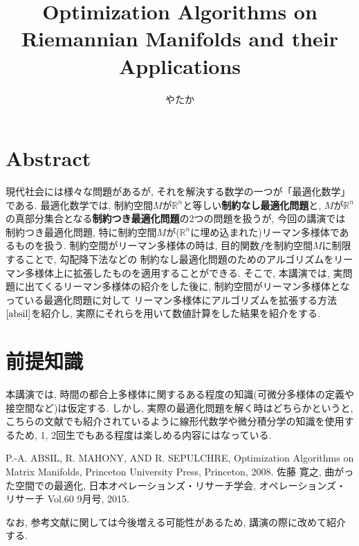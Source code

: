 \documentclass[11pt, a4paper, dvipdfmx]{jsarticle}
\title{Optimization Algorithms on Riemannian Manifolds and their Applications}
\author{やたか}
\date{}
\theoremstyle{definition}
\newcommand{\R}{\mathbb{R}}
\begin{document}
    
    \maketitle
    \section*{Abstract}
    現代社会には様々な問題があるが, それを解決する数学の一つが「最適化数学」である. 
    最適化数学では, 制約空間$M$が$\R^n$と等しい\textbf{制約なし最適化問題}と,
    $M$が$\R^n$の真部分集合となる\textbf{制約つき最適化問題}の2つの問題を扱うが, 今回の講演では
    制約つき最適化問題, 特に制約空間$M$が($\R^n$に埋め込まれた)リーマン多様体であるものを扱う.
    制約空間がリーマン多様体の時は, 目的関数$f$を制約空間$M$に制限することで, 勾配降下法などの
    制約なし最適化問題のためのアルゴリズムをリーマン多様体上に拡張したものを適用することができる. そこで, 本講演では,  
    実問題に出てくるリーマン多様体の紹介をした後に, 制約空間がリーマン多様体となっている最適化問題に対して
    リーマン多様体にアルゴリズムを拡張する方法$\cite{absil}$を紹介し, 実際にそれらを用いて数値計算をした結果を紹介をする. 
    \section*{前提知識}
    本講演では, 時間の都合上多様体に関するある程度の知識(可微分多様体の定義や接空間など)は仮定する. 
    しかし, 実際の最適化問題を解く時はどちらかというと, こちらの文献\cite{sato}でも紹介されているように線形代数学や微分積分学の知識を使用するため, 
    1, 2回生でもある程度は楽しめる内容にはなっている.
    \begin{thebibliography}{9}
         P.-A. ABSIL, R. MAHONY, AND R. SEPULCHRE, Optimization Algorithms on Matrix Manifolds, 
        Princeton University Press, Princeton, 2008.
         佐藤 寛之, 曲がった空間での最適化, 日本オペレーションズ・リサーチ学会, オペレーションズ・リサーチ Vol.60 9月号, 2015.
    \end{thebibliography}
    なお, 参考文献に関しては今後増える可能性があるため, 講演の際に改めて紹介する. 
\end{document}

